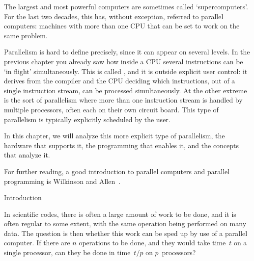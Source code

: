 
The largest and most powerful computers are sometimes called
`supercomputers'. For the last two decades, this has, without
exception, referred to parallel computers: machines with more than one
CPU that can be set to work on the same problem.

Parallelism is hard to define precisely, since it can appear on
several levels. In the previous chapter you already saw how inside a
CPU several instructions can be `in flight' simultaneously. This is
called , and it is outside
explicit user control: it derives from the compiler and the CPU
deciding which instructions, out of a single instruction stream, can
be processed simultaneously. At the other extreme is the sort of
parallelism where more than one instruction stream is handled by
multiple processors, often each on their own circuit board. This type
of parallelism is typically explicitly scheduled by the user.

In this chapter, we will analyze this more explicit type of
parallelism, the hardware that supports it, the programming that
enables it, and the concepts that analyze it.

For further reading, a good introduction to parallel computers and
parallel programming is Wilkinson and Allen~\cite{WilkinsonAllen}. 

 {Introduction}
\label{sec:parallel-intro}

In scientific codes, there is often a large amount of work to be done,
and it is often regular to some extent, with the same operation being
performed on many data. The question is then whether this work can be
sped up by use of a parallel computer. If there are $n$ operations to
be done, and they would take time~$t$ on a single processor, can they
be done in time~$t/p$ on $p$~processors?

